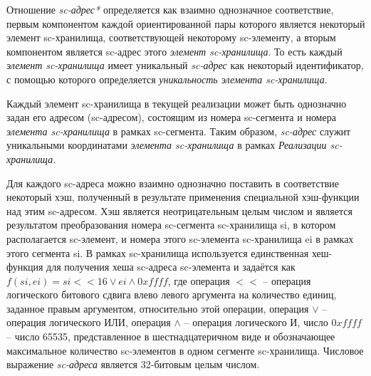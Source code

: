 Отношение \textit{sc-адрес*} определяется как взаимно однозначное соответствие, первым компонентом каждой ориентированной пары которого является некоторый элемент sc-хранилища, соответствующей некоторому sc-элементу, а вторым компонентом является sc-адрес этого \textit{элемент sc-хранилища}. То есть каждый \textit{элемент sc-хранилища} имеет уникальный \textit{sc-адрес} как некоторый идентификатор, с помощью которого определяется \textit{уникальность элемента sc-хранилища}.

Каждый элемент sc-хранилища в текущей реализации может быть однозначно задан его адресом (sc-адресом), состоящим из номера sc-сегмента и номера \textit{элемента sc-хранилища} в рамках sc-сегмента. Таким образом, \textit{sc-адрес} служит уникальными координатами \textit{элемента sc-хранилища} в рамках \textit{Реализации sc-хранилища}.

Для каждого sc-адреса можно взаимно однозначно поставить в соответствие некоторый хэш, полученный в результате применения специальной хэш-функции над этим sc-адресом. Хэш является неотрицательным целым числом и является результатом преобразования номера sc-сегмента sc-хранилища si, в котором располагается sc-элемент, и номера этого sc-элемента sc-хранилища ei в рамках этого сегмента si. В рамках sc-хранилища используется единственная хеш-функция для получения хеша sc-адреса sc-элемента и задаётся как $f(si, ei) = si << 16 \vee ei \wedge 0xffff$, где операция $<<$ -- операция логического битового сдвига влево левого аргумента на количество единиц, заданное правым аргументом, относительно этой операции, операция $\vee$ -- операция логического ИЛИ, операция $\wedge$ -- операция логического И, число $0xffff$ -- число 65535, представленное в шестнадцатеричном виде и обозначающее максимальное количество sc-элементов в одном сегменте sc-хранилища. Числовое выражение \textit{sc-адреса} является 32-битовым целым числом.

\begin{SCn}
\end{SCn}

